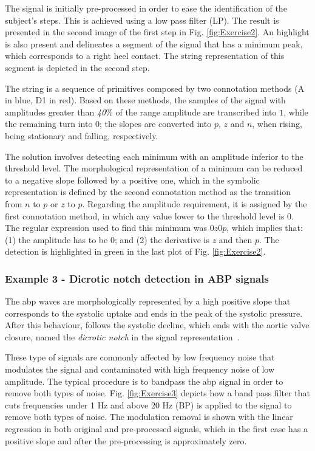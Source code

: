 The signal is initially pre-processed in order to ease the identification of the subject's steps. This is achieved using a low pass filter (LP). The result is presented in the second image of the first step in Fig. \ref{fig:Exercise2}. An highlight is also present and delineates a segment of the signal that has a minimum peak, which corresponds to a right heel contact. The string representation of this segment is depicted in the second step.
\par
The string is a sequence of primitives composed by two connotation methods (A in blue, D1 in red). Based on these methods, the samples of the signal with amplitudes greater than \textit{40}\% of the range amplitude are transcribed into $1$, while the remaining turn into $0$; the slopes are converted into $p$, $z$ and $n$, when rising, being stationary and falling, respectively.
\par
The solution involves detecting each minimum with an amplitude inferior to the threshold level. The morphological representation of a minimum can be reduced to a negative slope followed by a positive one, which in the symbolic representation is defined by the second connotation method as the transition from $n$ to $p$ or $z$ to $p$. Regarding the amplitude requirement, it is assigned by the first connotation method, in which any value lower to the threshold level is $0$. The regular expression used to find this minimum was $0z0p$, which implies that: (1) the amplitude has to be $0$; and (2) the derivative is $z$ and then $p$. The detection is highlighted in green in the last plot of Fig. \ref{fig:Exercise2}.

\subsubsection{Example 3 - Dicrotic notch detection in ABP signals}

The \gls{abp} waves are morphologically represented by a high positive slope that corresponds to the systolic uptake and ends in the peak of the systolic pressure. After this behaviour, follows the systolic decline, which ends with the aortic valve closure, named the \textit{dicrotic notch} in the signal representation~\cite{abpSignal}.
\par
These type of signals are commonly affected by low frequency noise that modulates the signal and contaminated with high frequency noise of low amplitude. The typical procedure is to bandpass the \gls{abp} signal in order to remove both types of noise. Fig. \ref{fig:Exercise3} depicts how a band pass filter that cuts frequencies under 1 Hz and above 20 Hz (BP) is applied to the signal to remove both types of noise. The modulation removal is shown with the linear regression in both original and pre-processed signals, which in the first case has a positive slope and after the pre-processing is approximately zero.

